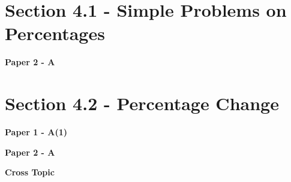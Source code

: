 \documentclass[12pt, a4paper]{article}
\begin{document}
\section*{Section 4.1 - Simple Problems on Percentages}\label{section:1-4-1}

\textbf{Paper 2 - A}
\begin{enumx}[label=\arabic*.,start=1]
\item {}\label{DSE2012-CoreP2-Q08} 
\item {}\label{DSE2021-CoreP2-Q09} 
\item {}\label{DSE2024-CoreP2-Q11} 
\end{enumx}




\section*{Section 4.2 - Percentage Change}\label{section:1-4-2}

\textbf{Paper 1 - A(1)}
\begin{enumx}[label=\arabic*.,start=4]
\item {}\label{DSE2012-CoreP1-Q04} 
\item {}\label{DSE2016-CoreP1-Q05} 
\item {}\label{DSE2020-CoreP1-Q05} 
\end{enumx}
\textbf{Paper 2 - A}
\begin{enumx}[label=\arabic*.,start=7]
\item {}\label{DSE2014-CoreP2-Q09} 
\end{enumx}
\textbf{Cross Topic}
\begin{enumx}[label=\arabic*.,start=8]
\item {}\label{DSE2012P-CoreP2-Q11} 
\item {}\label{DSE2014-CoreP1-Q05} 
\item {}\label{DSE2017-CoreP1-Q08} 
\end{enumx}
\end{document}
